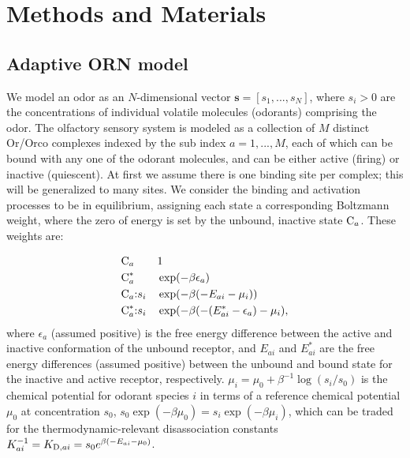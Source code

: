 \documentclass[9pt,lineno]{elife}
\begin{document}


\section{Methods and Materials}





\subsection{Adaptive ORN model} 


We model an odor as an $N$-dimensional vector ${\mathbf s=[ s_1,...,s_N]}$, where $s_i > 0$ are the concentrations of individual volatile molecules (odorants) comprising the odor. 
The olfactory sensory system is modeled as a collection of $M$ distinct Or/Orco complexes indexed by the sub index $a=1,...,M$, each of which can be bound with any one of the odorant molecules, and can be either active (firing) or inactive (quiescent). At first we assume there is one binding site per complex; this will be generalized to many sites. We consider the binding and activation processes to be in equilibrium, assigning each state a corresponding Boltzmann weight, where the zero of energy is set by the unbound, inactive state $\textup{C}_a$. These weights are:

\begin{align}
&\textup{C}_a        &&      1 \nonumber \\
&\textup{C}^*_a      &&      \exp({-\beta \epsilon_a}) \nonumber \\
&\textup{C}_a\textup{:}s_i     &&      \exp({-\beta(-E_{ai}  - \mu_{i})}) \nonumber \\
&\textup{C}^*_a\textup{:}s_i   &&      \exp({-\beta(-(E_{ai}^* - \epsilon_a) - \mu_{i}}),
\end{align}
where $\epsilon_a$ (assumed positive) is the free energy difference between the active and inactive conformation of the unbound receptor, and $E_{ai}$ and $E_{ai}^*$ are the free energy differences (assumed positive) between the unbound and bound state for the inactive and active receptor, respectively. $\mu_{i}=\mu_0+\beta^{-1}\log(s_i/s_0)$ is the chemical potential for odorant species $i$ in terms of a reference chemical potential $\mu_0$ at concentration $s_0$, $s_0\exp(-\beta \mu_0) = s_i\exp(-\beta \mu_{i})$, which can be traded for the thermodynamic-relevant disassociation constants $K_{ai}^{-1} = K_{\textup{D}, ai} = s_0 e^{\beta (-E_{ai} - \mu_0)}$. 
\end{document}
